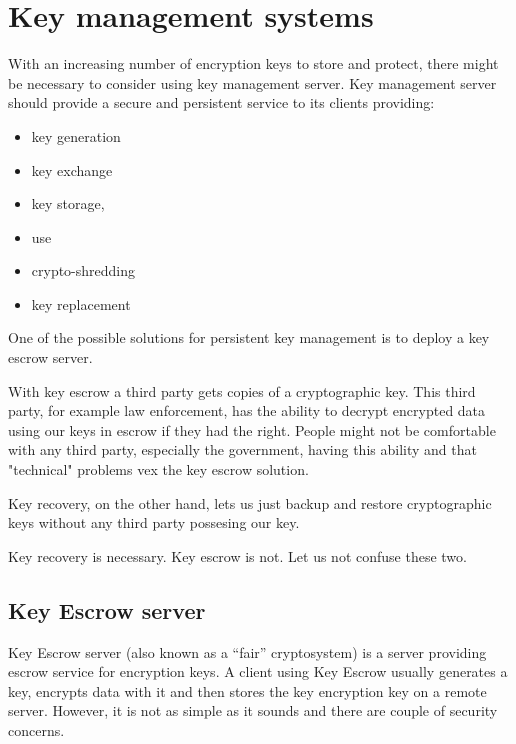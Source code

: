 \chapter{Key management systems}

With an increasing number of encryption keys to store and protect, there might be necessary to consider using key management server.
Key management server should provide a secure and persistent service to its clients providing:
\begin{itemize}
    \item key generation
    \item key exchange
    \item key storage,
    \item use
    \item crypto-shredding
    \item key replacement
\end{itemize}
One of the possible solutions for persistent key management is to deploy a key escrow server.

With key escrow a third party gets copies of a cryptographic key.
This third party, for example law enforcement, has the ability to decrypt encrypted data using our keys in escrow if they had the right.
People might not be comfortable with any third party, especially the government, having this ability and that "technical" problems vex the key escrow solution.

Key recovery, on the other hand, lets us just backup and restore cryptographic keys without any third party possesing our key.

Key recovery is necessary.
Key escrow is not.
Let us not confuse these two.

\section{Key Escrow server}\label{escrow}

Key Escrow server (also known as a “fair” cryptosystem) is a server providing escrow service for encryption keys.
A client using Key Escrow usually generates a key, encrypts data with it and then stores the key encryption key on a remote server.
However, it is not as simple as it sounds and there are couple of security concerns.

